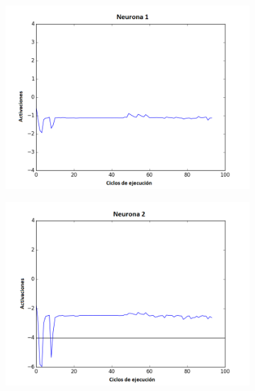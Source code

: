 \begin{figure}[!h]
    \centering %
\begin{subfigure}{0.33\textwidth}
  \includegraphics[width=\linewidth]{Imagenes/Agente2Activaciones/Agente2/Neurona0}
\end{subfigure}\hfil %
\begin{subfigure}{0.33\textwidth}
  \includegraphics[width=\linewidth]{Imagenes/Agente2Activaciones/Agente2/Neurona1}
\end{subfigure}\hfil %
\begin{subfigure}{0.33\textwidth}

\end{subfigure}
\end{figure}
